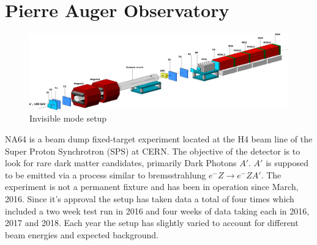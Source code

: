 
\chapter{Pierre Auger Observatory}
\label{sec:setup}
\begin{figure}[h!]
\centering
\includegraphics[width=\textwidth]{thesis_figures/Invisible_3d_setup.png}
\caption{Invisible mode setup~\cite{Banerjee:2016tad}}
\label{fig:Invisible_mode_setup}
\end{figure}

NA64 is a beam dump fixed-target experiment located at the H4 beam line of the Super Proton Synchrotron (SPS) at CERN. The objective of the detector is to look for rare dark matter candidates, primarily Dark Photons $A'$. $A'$ is supposed to be emitted via a process similar to bremsstrahlung $e^-Z\rightarrow e^- Z A'$. The experiment is not a permanent fixture and has been in operation since March, 2016. Since it's approval the setup has taken data a total of four times which included a two week test run in 2016 and four weeks of data taking each in 2016, 2017 and 2018. Each year the setup has slightly varied to account for different beam energies and expected background.


